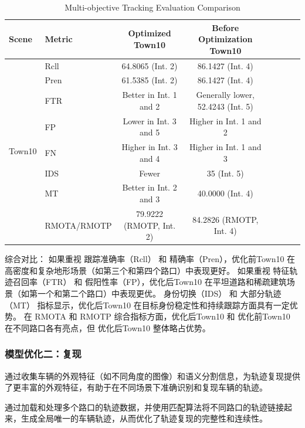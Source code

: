\begin{table}[htbp]
	\centering
	\caption{Multi-objective Tracking Evaluation Comparison}
	\label{tab:tracking_comparison}
	\begin{tabular}{@{}llcccccc@{}}
		\toprule
		\textbf{Scene} & \textbf{Metric} & \textbf{Optimized Town10} & \textbf{Before Optimization Town10} \\
		\midrule
		\multirow{8}{*}{Town10} 
		& Rcll & 64.8065 (Int. 2) & 86.1427 (Int. 4) \\
		& Pren & 61.5385 (Int. 2) & 86.1427 (Int. 4) \\
		& FTR & Better in Int. 1 and 2 & Generally lower, 52.4243 (Int. 5) \\
		& FP & Lower in Int. 3 and 5 & Higher in Int. 1 and 2 \\
		& FN & Higher in Int. 3 and 4 & Higher in Int. 1 and 3 \\
		& IDS & Fewer & 35 (Int. 5) \\
		& MT & Better in Int. 2 and 3 & 40.0000 (Int. 4) \\
		& RMOTA/RMOTP & 79.9222 (RMOTP, Int. 2) & 84.2826 (RMOTP, Int. 4) \\
		\bottomrule
	\end{tabular}
\end{table}



综合对比：
如果重视 跟踪准确率（Rcll） 和 精确率（Pren），优化前Town10 在高密度和复杂地形场景（如第三个和第四个路口）中表现更好。
如果重视 特征轨迹召回率（FTR） 和 假阳性率（FP），优化后Town10 在平坦道路和稀疏建筑场景（如第一个和第二个路口）中表现更优。
身份切换（IDS） 和 大部分轨迹（MT） 指标显示，优化后Town10 在目标身份稳定性和持续跟踪方面具有一定优势。
在 RMOTA 和 RMOTP 综合指标方面，优化后Town10 和 优化前Town10 在不同路口各有亮点，但 优化后Town10 整体略占优势。














\subsubsection{模型优化二：复现}

通过收集车辆的外观特征（如不同角度的图像）和语义分割信息，为轨迹复现提供了更丰富的外观特征，有助于在不同场景下准确识别和复现车辆的轨迹。

通过加载和处理多个路口的轨迹数据，并使用匹配算法将不同路口的轨迹链接起来，生成全局唯一的车辆轨迹，从而优化了轨迹复现的完整性和连续性。


